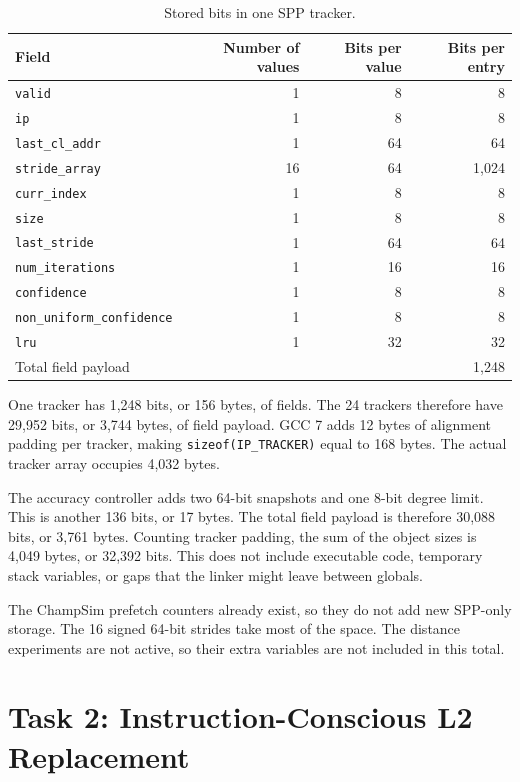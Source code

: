 \documentclass[11pt,a4paper]{article}
\begin{document}
\begin{table}[htbp]
\centering
\small
\begin{tabular}{lrrr}
\toprule
Field & Number of values & Bits per value & Bits per entry \\
\midrule
\texttt{valid} & 1 & 8 & 8 \\
\texttt{ip} & 1 & 8 & 8 \\
\texttt{last\_cl\_addr} & 1 & 64 & 64 \\
\texttt{stride\_array} & 16 & 64 & 1,024 \\
\texttt{curr\_index} & 1 & 8 & 8 \\
\texttt{size} & 1 & 8 & 8 \\
\texttt{last\_stride} & 1 & 64 & 64 \\
\texttt{num\_iterations} & 1 & 16 & 16 \\
\texttt{confidence} & 1 & 8 & 8 \\
\texttt{non\_uniform\_confidence} & 1 & 8 & 8 \\
\texttt{lru} & 1 & 32 & 32 \\
\midrule
Total field payload & & & 1,248 \\
\bottomrule
\end{tabular}
\caption{Stored bits in one SPP tracker.}
\end{table}

One tracker has 1,248 bits, or 156 bytes, of fields. The 24 trackers
therefore have 29,952 bits, or 3,744 bytes, of field payload. GCC 7 adds
12 bytes of alignment padding per tracker, making
\texttt{sizeof(IP\_TRACKER)} equal to 168 bytes. The actual tracker
array occupies 4,032 bytes.

The accuracy controller adds two 64-bit snapshots and one 8-bit degree
limit. This is another 136 bits, or 17 bytes. The total field payload
is therefore 30,088 bits, or 3,761 bytes. Counting tracker padding, the
sum of the object sizes is 4,049 bytes, or 32,392 bits. This does not
include executable code, temporary stack variables, or gaps that the
linker might leave between globals.

The ChampSim prefetch counters already exist, so they do not add new
SPP-only storage. The 16 signed 64-bit strides take most of the space.
The distance experiments are not active, so their extra variables are
not included in this total.

\clearpage
\part{Task 2: Instruction-Conscious L2 Replacement}
\end{document}

